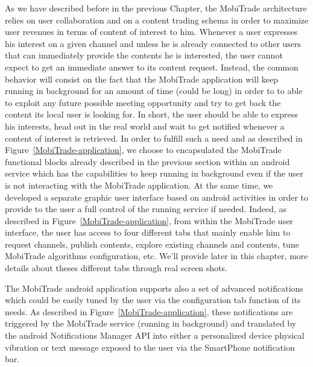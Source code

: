 As we have described before in the previous Chapter, the MobiTrade architecture relies on user collaboration and on a content trading schema in order to maximize user revenues in terms of content of interest to him. Whenever a user expresses his interest on a given channel and unless he is already connected to other users that can immediately provide the contents he is interested, the user cannot expect to get an immediate answer to its content request. Instead, the common behavior will consist on the fact that the MobiTrade application will keep running in background for an amount of time (could be long) in order to to able to exploit any future possible meeting opportunity and try to get back the content its local user is looking for. In short, the user should be able to express his interests, head out in the real world and wait to get notified whenever a content of interest is retrieved.  In order to fulfill such a need and as described in Figure~\ref{MobiTrade-application}, we choose to encapsulated the MobiTrade functional blocks already described in the previous section within an android service which has the capabilities to keep running in background even if the user is not interacting with the MobiTrade application. At the same time, we developed a separate graphic user interface based on android activities in order to provide to the user a full control of the running service if needed. Indeed, as described in Figure~\ref{MobiTrade-application}, from within the MobiTrade user interface, the user has access to four different tabs that mainly enable him to request channels, publish contents, explore existing channels and contents, tune MobiTrade algorithms configuration, etc. We'll provide later in this chapter, more details about theses different tabs through real screen shots.

The MobiTrade android application supports also a set of advanced notifications which could be easily tuned by the user via the configuration tab function of its needs. As described in Figure~\ref{MobiTrade-application}, these notifications are triggered by the MobiTrade service (running in background) and translated by the android Notifications Manager API into either a personalized device physical vibration or text message exposed to the user via the SmartPhone notification bar. 

